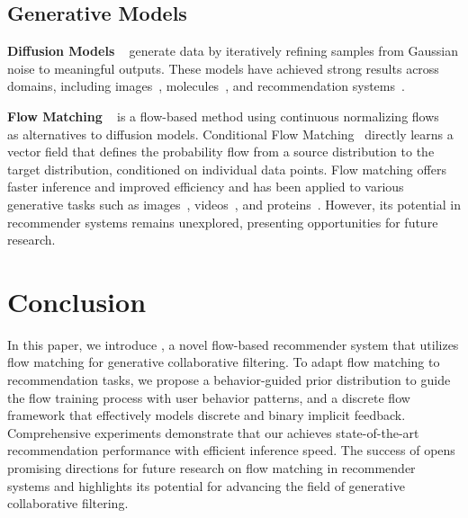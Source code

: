\documentclass[sigconf]{acmart}
\begin{document}
\vspace{-3pt}
\subsection{Generative Models}

\noindent \textbf{Diffusion Models}  
~\cite{sohl2015deep, song2019generative, ho2020denoising, song2020score} generate data by iteratively refining samples from Gaussian noise to meaningful outputs. These models have achieved strong results across domains, including images~\cite{ho2020denoising, rombach2022high}, molecules~\cite{xu2022geodiff, jing2022torsional}, and recommendation systems~\cite{lin2024survey, li2023diffurec, yang2024generate}. 

\noindent \textbf{Flow Matching}
~\cite{lipman2022flow, liu2022flow, albergo2022building} is a flow-based method using continuous normalizing flows~\cite{chen2018neural} as alternatives to diffusion models. Conditional Flow Matching~\cite{lipman2022flow, tong2023improving} directly learns a vector field that defines the probability flow from a source distribution to the target distribution, conditioned on individual data points. Flow matching offers faster inference and improved efficiency and has been applied to various generative tasks such as images~\cite{esser2403scaling}, videos~\cite{polyak2024movie}, and proteins~\cite{bose2023se}. However, its potential in recommender systems remains unexplored, presenting opportunities for future research.  

\vspace{-2pt}
\section{Conclusion}
In this paper, we introduce \ours, a novel flow-based recommender system that utilizes flow matching for generative collaborative filtering. To adapt flow matching to recommendation tasks, we propose a behavior-guided prior distribution to guide the flow training process with user behavior patterns, and a discrete flow framework that effectively models discrete and binary implicit feedback. Comprehensive experiments demonstrate that our \ours achieves state-of-the-art recommendation performance with efficient inference speed. 
The success of \ours opens promising directions for future research on flow matching in recommender systems and highlights its potential for advancing the field of generative collaborative filtering.



\balance
\end{document}
